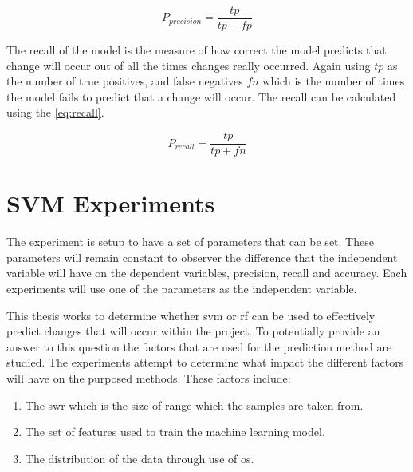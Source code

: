 \begin{equation} 
\label{eq:precision}
P_{precision} = \frac{tp}{tp+fp}
\end{equation}

The recall of the model is the measure of how correct the model predicts that change will occur out of all the times changes really occurred. Again using $tp$ as the number of true positives, and false negatives $fn$ which is the number of times the model fails to predict that a change will occur. The recall can be calculated using the \autoref{eq:recall}.

\begin{equation} 
\label{eq:recall}
P_{recall} = \frac{tp}{tp+fn}
\end{equation}

\section{SVM Experiments}
\label{sec:svm_experiments}

The experiment is setup to have a set of parameters that can be set. These parameters will remain constant to observer the difference that the independent variable will have on the dependent variables, precision, recall and accuracy. Each experiments will use one of the parameters as the independent variable.


This thesis works to determine whether \gls{svm} or \gls{rf} can be used to effectively predict changes that will occur within the project. To potentially provide an answer to this question the factors that are used for the prediction method are studied. The experiments attempt to determine what impact the different factors will have on the purposed methods. These factors include:
\begin{enumerate}
\item The \gls{swr} which is the size of range which the samples are taken from.
\item The set of features used to train the machine learning model.
\item The distribution of the data through use of \gls{os}.
\end{enumerate}


